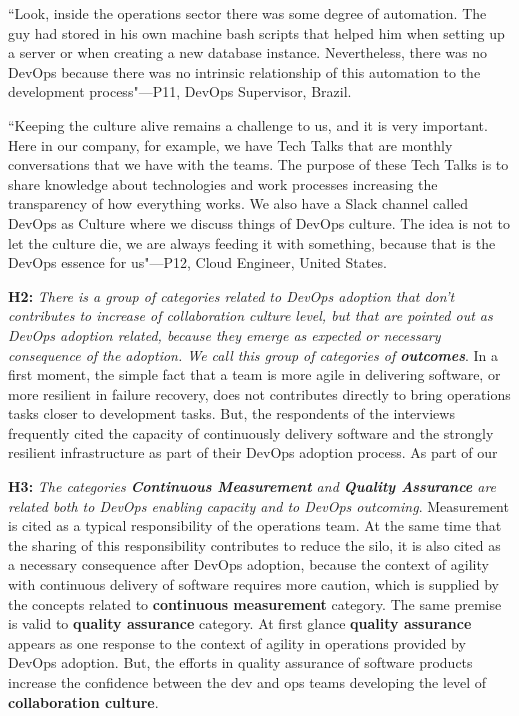 ``Look, inside the operations sector there was some degree of automation. The guy
had stored in his own machine bash scripts that helped him when setting up a
server or when creating a new database instance. Nevertheless, there was no DevOps
because there was no intrinsic relationship of this automation to the
development process"---P11, DevOps Supervisor, Brazil.

``Keeping the culture alive remains a challenge to us, and it is very
important. Here in our company, for example, we have Tech Talks that are
monthly conversations that we have with the teams. The purpose of these Tech
Talks is to share knowledge about technologies and work processes increasing the
transparency of how everything works. We also have a Slack channel called
DevOps as Culture where we discuss things of DevOps culture. The idea is not to
let the culture die, we are always feeding it with something, because that is
the DevOps essence for us"---P12, Cloud Engineer, United States.

\textbf{H2:} \textit{There is a group of categories related to DevOps adoption
that don't contributes to increase of collaboration culture level, but that are
pointed out as DevOps adoption related, because they emerge as expected or
necessary consequence of the adoption. We call this group of categories of
\textbf{outcomes}}. In a first moment, the simple fact that a team is more
agile in delivering software, or more resilient in failure recovery, does not
contributes directly to bring operations tasks closer to development tasks.
But, the respondents of the interviews frequently cited the capacity of
continuously delivery software and the strongly resilient infrastructure as
part of their DevOps adoption process. As part of our

\textbf{H3:} \textit{The categories \textbf{Continuous Measurement} and \textbf{Quality Assurance} are related both to DevOps enabling capacity and to DevOps outcoming}. Measurement is cited as a typical responsibility of the operations team. At the same time that the sharing of this responsibility contributes to reduce the silo, it is also cited as a necessary consequence after DevOps adoption, because the context of agility with continuous delivery of software requires more caution, which is supplied by the concepts related to \textbf{continuous measurement} category. The same premise is valid to \textbf{quality assurance} category. At first glance \textbf{quality assurance} appears as one response to the context of agility in operations provided by DevOps adoption. But, the efforts in quality assurance of software products increase the confidence between the dev and ops teams developing the level of \textbf{collaboration culture}.

